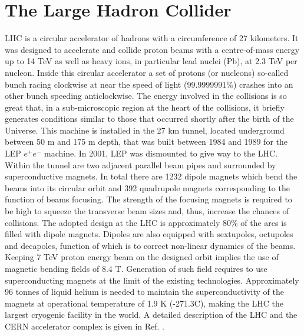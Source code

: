\section{The Large Hadron Collider}
\label{chap2:LHC}
LHC is a circular accelerator of hadrons with a circumference of 27 kilometers. It was designed to accelerate and collide proton beams with a centre-of-mass energy up to 14 TeV as well as heavy ions, in particular lead nuclei (Pb), at 2.3 TeV per nucleon. Inside this circular accelerator a set of protons (or nucleons) so-called bunch racing clockwise at near the speed of light (99.9999991\%) crashes into an other bunch speeding anticlockwise. The energy involved in the collisions is so great that, in a sub-microscopic region at the heart of the collisions, it briefly generates conditions similar to those that occurred shortly after the birth of the Universe. This machine is installed in the 27 km tunnel, located underground between 50 m and 175 m depth, that was built between 1984 and 1989 for the LEP $e^+e^-$ machine. In 2001, LEP was dismounted to give way to the LHC. \\ 
Within the tunnel are two adjacent parallel beam pipes and surrounded by superconductive magnets. In total there are 1232 dipole magnets which bend the beams into its circular orbit and 392 quadrupole magnets corresponding to the function of beams focusing. The strength of the focusing magnets is required to be high to squeeze the transverse beam sizes and, thus, increase the chances of collisions. The adopted design at the LHC is approximately 80\% of the arcs is filled with dipole magnets. Dipoles are also equipped with sextupoles, octupoles and decapoles, function of which is to correct non-linear dynamics of the beams.  Keeping 7 TeV proton energy beam on the designed orbit implies the use of magnetic bending fields of 8.4 T. Generation of such field requires to use superconducting magnets at the limit of the existing technologies. Approximately 96 tonnes of liquid helium is needed to maintain the superconductivity of the magnets at  operational temperature of 1.9 K (-271.3C), making the LHC the largest cryogenic facility in the world.  A detailed description of the LHC and the CERN accelerator complex is given in Ref. \cite{LHCTDR}.

